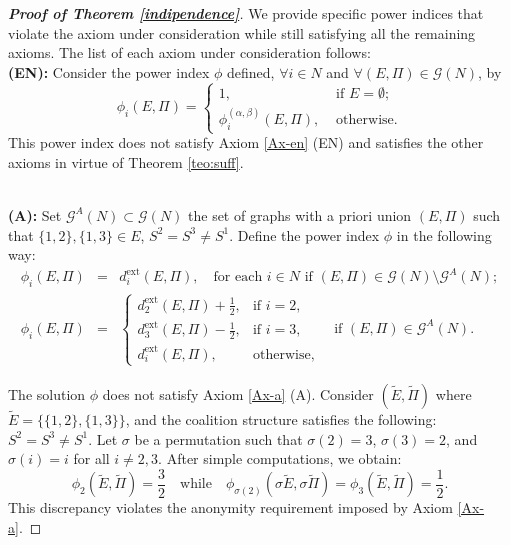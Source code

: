 \documentclass[preprint,11pt,authoryear]{elsarticle}
\theoremstyle{plain}
\begin{document}
\begin{proof}[\bf Proof of Theorem \ref{indipendence}]
	We provide specific power indices that violate the axiom under consideration while still satisfying all the remaining axioms. The list of each axiom under consideration follows:    
	\noindent\vspace{.5\baselineskip} \\
	\textbf{(EN):}  
	Consider the power index $\phi$ defined, $\forall i\in N$ and $\forall(E,\Pi)\in\mathcal{G}(N)$, by 
	\begin{equation*}
		\phi_i(E,\Pi)=\begin{cases}
			1, & \text{ if } E=\emptyset;\\
			\phi_{i}^{(\alpha,\beta)}(E,\Pi), & \text{ otherwise.}
		\end{cases}
	\end{equation*}
	This power index does not satisfy Axiom \ref{Ax-en} (EN) and  satisfies the other axioms in virtue of Theorem \ref{teo:suff}.
	
	\noindent\vspace{.5\baselineskip}\\
	\textbf{(A):} 
	Set $\mathcal{G}^A(N)\subset \mathcal{G}(N)$ the set of graphs with a priori union $(E,\Pi)$ such that $ \{1,2\},\{1,3\}\in E$, $S^2=S^3\neq S^1$. Define the power index $\phi$ in the following way:
	\begin{eqnarray}
		\phi_i(E,\Pi) &=& d_i^{\text{ext}}(E,\Pi), \quad \text{for each } i \in N \text{ if } (E,\Pi) \in \mathcal{G}(N)\setminus \mathcal{G}^A(N); \\
		\phi_i(E,\Pi) &=& 
		\begin{cases}
			d_2^{\text{ext}}(E,\Pi) + \frac{1}{2}, & \text{if } i=2, \\
			d_3^{\text{ext}}(E,\Pi) - \frac{1}{2}, & \text{if } i=3, \\
			d_i^{\text{ext}}(E,\Pi), & \text{otherwise,}
		\end{cases}
		\quad \text{if } (E,\Pi) \in \mathcal{G}^A(N).
	\end{eqnarray}
	
	
	
	
	The solution $\phi$ does not satisfy Axiom \ref{Ax-a} (A). Consider $(\tilde{E},\tilde{\Pi})$ where $\tilde{E} = \big\{\{1,2\}, \{1,3\}\big\}$, and the coalition structure satisfies the following:  $S^2 = S^3 \neq S^1$. Let $\sigma$ be a permutation such that $\sigma(2) = 3$, $\sigma(3) = 2$, and $\sigma(i) = i$ for all $i \neq 2,3$. After simple computations, we obtain:
	\[
	\phi_2(\tilde{E},\tilde{\Pi}) = \frac{3}{2} \quad \text{while} \quad \phi_{\sigma(2)}(\sigma \tilde{E}, \sigma \tilde{\Pi}) = \phi_3(\tilde{E},\tilde{\Pi}) = \frac{1}{2}.
	\]
	This discrepancy violates the anonymity requirement imposed by Axiom \ref{Ax-a}.
	

\end{proof}
\end{document}

